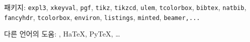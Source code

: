 \begin{frame}[fragile]
  \vspace{1em}
  패키지: \texttt{expl3}, \texttt{xkeyval}, \texttt{pgf}, \texttt{tikz}, \texttt{tikzcd}, \texttt{ulem}, \texttt{tcolorbox}, \texttt{bibtex}, \texttt{natbib}, \texttt{fancyhdr}, \texttt{tcolorbox}, \texttt{environ}, \texttt{listings}, \texttt{minted}, \texttt{beamer,...}

  \vspace{1em} 다른 언어의 도움: \LuaLaTeX, HaTeX, PyTeX, \dots
\end{frame}